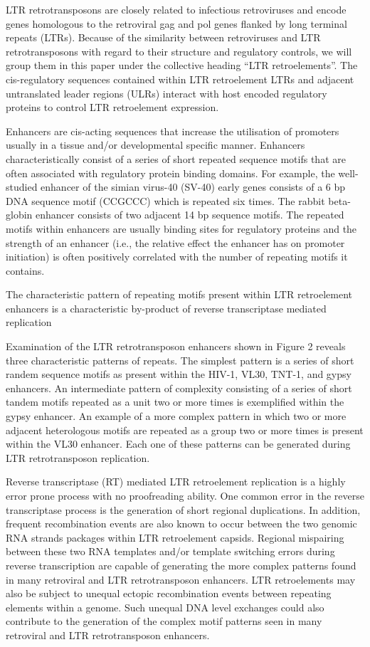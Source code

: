 LTR retrotransposons are closely related to infectious retroviruses and encode genes homologous to the retroviral gag and pol genes flanked by long terminal repeats (LTRs). Because of the similarity between retroviruses and LTR retrotransposons with regard to their structure and regulatory controls, we will group them in this paper under the collective heading “LTR retroelements”. The cis-regulatory sequences contained within LTR retroelement LTRs and adjacent untranslated leader regions (ULRs) interact with host encoded regulatory proteins to control LTR retroelement expression.

Enhancers are cis-acting sequences that increase the utilisation of promoters usually in a tissue and/or developmental specific manner. Enhancers characteristically consist of a series of short repeated sequence motifs that are often associated with regulatory protein binding domains. For example, the well-studied enhancer of the simian virus-40 (SV-40) early genes consists of a 6 bp DNA sequence motif (CCGCCC) which is repeated six times. The rabbit beta-globin enhancer consists of two adjacent 14 bp sequence motifs. The repeated motifs within enhancers are usually binding sites for regulatory proteins and the strength of an enhancer (i.e., the relative effect the enhancer has on promoter initiation) is often positively correlated with the number of repeating motifs it contains.

The characteristic pattern of repeating motifs present within LTR retroelement enhancers is a characteristic by-product of reverse transcriptase mediated replication

Examination of the LTR retrotransposon enhancers shown in Figure 2 reveals three characteristic patterns of repeats. The simplest pattern is a series of short randem sequence motifs as present within the HIV-1, VL30, TNT-1, and gypsy enhancers. An intermediate pattern of complexity consisting of a series of short tandem motifs repeated as a unit two or more times is exemplified within the gypsy enhancer. An example of a more complex pattern in which two or more adjacent heterologous motifs are repeated as a group two or more times is present within the VL30 enhancer. Each one of these patterns can be generated during LTR retrotransposon replication.

Reverse transcriptase (RT) mediated LTR retroelement replication is a highly error prone process with no proofreading ability. One common error in the reverse transcriptase process is the generation of short regional duplications. In addition, frequent recombination events are also known to occur between the two genomic RNA strands packages within LTR retroelement capsids. Regional mispairing between these two RNA templates and/or template switching errors during reverse transcription are capable of generating the more complex patterns found in many retroviral and LTR retrotransposon enhancers. LTR retroelements may also be subject to unequal ectopic recombination events between repeating elements within a genome. Such unequal DNA level exchanges could also contribute to the generation of the complex motif patterns seen in many retroviral and LTR retrotransposon enhancers.

